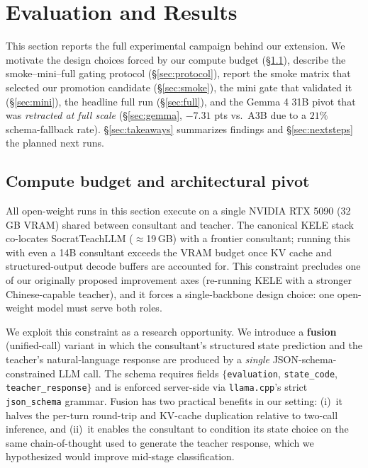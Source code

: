 \documentclass[11pt]{article}
\begin{document}
\section{Evaluation and Results}

This section reports the full experimental campaign behind our extension. We motivate the design choices forced by our compute budget (\S\ref{sec:budget}), describe the smoke--mini--full gating protocol (\S\ref{sec:protocol}), report the smoke matrix that selected our promotion candidate (\S\ref{sec:smoke}), the mini gate that validated it (\S\ref{sec:mini}), the headline full run (\S\ref{sec:full}), and the Gemma 4 31B pivot that was \emph{retracted at full scale} (\S\ref{sec:gemma}, $-7.31$ pts vs.\ A3B due to a $21\%$ schema-fallback rate). \S\ref{sec:takeaways} summarizes findings and \S\ref{sec:nextsteps} the planned next runs.

\subsection{Compute budget and architectural pivot}
\label{sec:budget}

All open-weight runs in this section execute on a single NVIDIA RTX 5090 (32\,GB VRAM) shared between consultant and teacher. The canonical KELE stack co-locates SocratTeachLLM ($\approx$19\,GB) with a frontier consultant; running this with even a 14B consultant exceeds the VRAM budget once KV cache and structured-output decode buffers are accounted for. This constraint precludes one of our originally proposed improvement axes (re-running KELE with a stronger Chinese-capable teacher), and it forces a single-backbone design choice: one open-weight model must serve both roles.

We exploit this constraint as a research opportunity. We introduce a \textbf{fusion} (unified-call) variant in which the consultant's structured state prediction and the teacher's natural-language response are produced by a \emph{single} JSON-schema-constrained LLM call. The schema requires fields $\{$\texttt{evaluation}, \texttt{state\_code}, \texttt{teacher\_response}$\}$ and is enforced server-side via \texttt{llama.cpp}'s strict \texttt{json\_schema} grammar. Fusion has two practical benefits in our setting: (i)~it halves the per-turn round-trip and KV-cache duplication relative to two-call inference, and (ii)~it enables the consultant to condition its state choice on the same chain-of-thought used to generate the teacher response, which we hypothesized would improve mid-stage classification.
\end{document}

